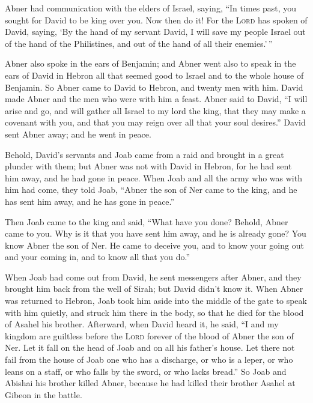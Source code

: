  Abner had communication with the elders of Israel,
saying, ``In times past, you sought for David to be king over you.
 Now then do it! For the \textsc{Lord} has spoken of
David, saying, `By the hand of my servant David, I will save my people
Israel out of the hand of the Philistines, and out of the hand of all
their enemies.'\,''

 Abner also spoke in the ears of Benjamin; and Abner went
also to speak in the ears of David in Hebron all that seemed good to
Israel and to the whole house of Benjamin.  So Abner came
to David to Hebron, and twenty men with him. David made Abner and the
men who were with him a feast.  Abner said to David, ``I
will arise and go, and will gather all Israel to my lord the king, that
they may make a covenant with you, and that you may reign over all that
your soul desires.'' David sent Abner away; and he went in peace.

 Behold, David's servants and Joab came from a raid and
brought in a great plunder with them; but Abner was not with David in
Hebron, for he had sent him away, and he had gone in peace.
 When Joab and all the army who was with him had come,
they told Joab, ``Abner the son of Ner came to the king, and he has sent
him away, and he has gone in peace.''

 Then Joab came to the king and said, ``What have you
done? Behold, Abner came to you. Why is it that you have sent him away,
and he is already gone?  You know Abner the son of Ner.
He came to deceive you, and to know your going out and your coming in,
and to know all that you do.''

 When Joab had come out from David, he sent messengers
after Abner, and they brought him back from the well of Sirah; but David
didn't know it.  When Abner was returned to Hebron, Joab
took him aside into the middle of the gate to speak with him quietly,
and struck him there in the body, so that he died for the blood of
Asahel his brother.  Afterward, when David heard it, he
said, ``I and my kingdom are guiltless before the \textsc{Lord} forever
of the blood of Abner the son of Ner.  Let it fall on the
head of Joab and on all his father's house. Let there not fail from the
house of Joab one who has a discharge, or who is a leper, or who leans
on a staff, or who falls by the sword, or who lacks bread.''
 So Joab and Abishai his brother killed Abner, because he
had killed their brother Asahel at Gibeon in the battle.

